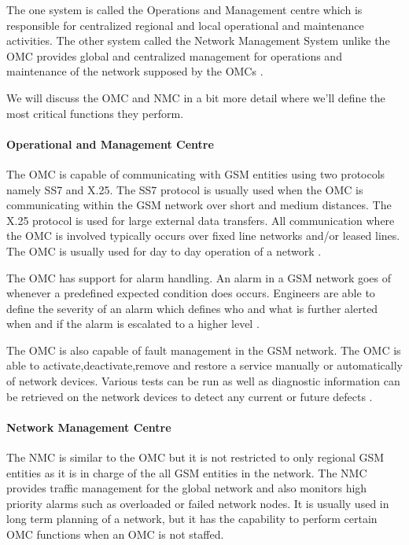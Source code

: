 The one system is called the Operations and Management centre which is responsible for centralized regional and local operational and maintenance activities. The other system called the Network Management System unlike the OMC provides global and centralized management for operations and maintenance of the network supposed by the OMCs \cite{GSMSysEngin}.

We will discuss the OMC and NMC in a bit more detail where we'll define the most critical functions they perform.

\paragraph{Operational and Management Centre}
The OMC is capable of communicating with GSM entities using two protocols namely SS7 and X.25. The SS7 protocol is usually used when the OMC is communicating within the GSM network over short and medium distances. The X.25 protocol is used for large external data transfers. All communication where the OMC is involved typically occurs over fixed line networks and/or leased lines. The OMC is usually used for day to day operation of a network \cite{GSMSysEngin}.

The OMC has support for alarm handling. An alarm in a GSM network goes of whenever a predefined expected condition does occurs. Engineers are able to define the severity of an alarm which defines who and what is further alerted when and if the alarm is escalated to a higher level \cite{GSMSysEngin}.

The OMC is also capable of fault management in the GSM network. The OMC is able to activate,deactivate,remove and restore a service manually or automatically of network devices\cite{GSM92}. Various tests can be run as well as diagnostic information can be retrieved on the network devices to detect any current or future defects \cite{GSMSysEngin}.

\paragraph{Network Management Centre}
The NMC is similar to the OMC but it is not restricted to only regional GSM entities as it is in charge of the all GSM entities in the network. The NMC provides traffic management for the global network and also monitors high priority alarms such as overloaded or failed network nodes. It is usually used in long term planning of a network, but it has the capability to perform certain OMC functions when an OMC is not staffed. 

